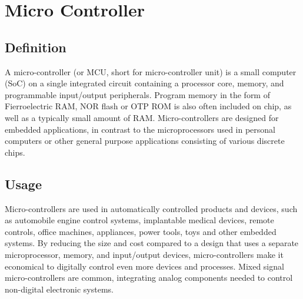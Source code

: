 \section{Micro Controller}

\subsection{Definition}
A micro-controller (or MCU, short for micro-controller unit) is a small computer (SoC) on a single integrated circuit containing a processor core, memory, and programmable input/output peripherals. Program memory in the form of Fierroelectric RAM, NOR flash or OTP ROM is also often included on chip, as well as a typically small amount of RAM. Micro-controllers are designed for embedded applications, in contrast to the microprocessors used in personal computers or other general purpose applications consisting of various discrete chips.


\subsection{Usage}
Micro-controllers are used in automatically controlled products and devices, such as automobile engine control systems, implantable medical devices, remote controls, office machines, appliances, power tools, toys and other embedded systems. By reducing the size and cost compared to a design that uses a separate microprocessor, memory, and input/output devices, micro-controllers make it economical to digitally control even more devices and processes. Mixed signal micro-controllers are common, integrating analog components needed to control non-digital electronic systems.



